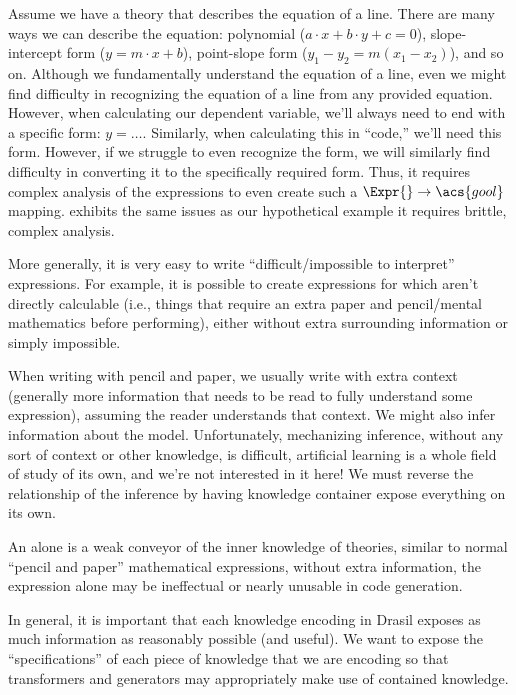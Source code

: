 Assume we have a theory that describes the equation of a line. There are many
ways we can describe the equation: polynomial (\(a \cdot{} x + b \cdot{} y + c =
0\)), slope-intercept form (\(y = m \cdot{} x + b\)), point-slope form (\(y_1 -
y_2 = m(x_1 - x_2)\)), and so on. Although we fundamentally understand the
equation of a line, even we might find difficulty in recognizing the equation of
a line from any provided equation. However, when calculating our dependent
variable, we'll always need to end with a specific form: \(y = \ldots{}\).
Similarly, when calculating this in ``code,'' we'll need this form. However, if
we struggle to even recognize the form, we will similarly find difficulty in
converting it to the specifically required form. Thus, it requires complex
analysis of the expressions to even create such a \(\Expr{} \rightarrow
\acs{gool}\) mapping. \RelationConcept{} exhibits the same issues as our
hypothetical example \textemdash{} it requires brittle, complex analysis.

More generally, it is very easy to write ``difficult/impossible to interpret''
expressions. For example, it is possible to create expressions for which aren't
directly calculable (i.e., things that require an extra paper and pencil/mental
mathematics before performing), either without extra surrounding information or
simply impossible.

When writing with pencil and paper, we usually write with extra context
(generally more information that needs to be read to fully understand some
expression), assuming the reader understands that context. We might also infer
information about the model. Unfortunately, mechanizing inference, without any
sort of context or other knowledge, is difficult, artificial learning is a whole
field of study of its own, and we're not interested in it here! We must reverse
the relationship of the inference by having knowledge container expose
everything on its own.

An \Expr{} alone is a weak conveyor of the inner knowledge of theories, similar
to normal ``pencil and paper'' mathematical expressions, without extra
information, the expression alone may be ineffectual or nearly unusable in code
generation.

In general, it is important that each knowledge encoding in Drasil exposes as
much information as reasonably possible (and useful). We want to expose the
``specifications'' of each piece of knowledge that we are encoding so that
transformers and generators may appropriately make use of contained knowledge.

